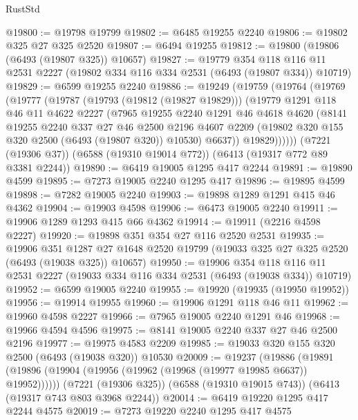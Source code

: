 \begin{lexlean}{RustStd}
\begin{coremodule}
@19800 := @19798 @19799
@19802 := @6485 @19255 @2240
@19806 := @19802 @325 @27 @325 @2520
@19807 := @6494 @19255
@19812 := @19800 (@19806 (@6493 (@19807 @325)) @10657)
@19827 := @19779
    @354
    @118
    @116
    @11
    @2531
    @2227
    (@19802 @334 @116 @334 @2531 (@6493 (@19807 @334)) @10719)
@19829 := @6599 @19255 @2240
@19886 := @19249
    (@19759
      (@19764
        (@19769
          (@19777
            (@19787
              (@19793 (@19812 (@19827 @19829)))
              (@19779
                @1291
                @118
                @46
                @11
                @4622
                @2227
                (@7965
                  @19255
                  @2240
                  @1291
                  @46
                  @4618
                  @4620
                  (@8141
                    @19255
                    @2240
                    @337
                    @27
                    @46
                    @2500
                    @2196
                    @4607
                    @2209
                    (@19802 @320 @155 @320 @2500 (@6493 (@19807 @320)) @10530)
                    @6637))
                @19829))))))
    (@7221 (@19306 @37))
    (@6588 (@19310 @19014 @772))
    (@6413 (@19317 @772 @89 @3381 @2244))
@19890 := @6419 @19005 @1295 @417 @2244
@19891 := @19890 @4599
@19895 := @7273 @19005 @2240 @1295 @417
@19896 := @19895 @4599
@19898 := @7282 @19005 @2240
@19903 := @19898 @1289 @1291 @415 @46 @4362
@19904 := @19903 @4598
@19906 := @6473 @19005 @2240
@19911 := @19906 @1289 @1293 @415 @66 @4362
@19914 := @19911 (@2216 @4598 @2227)
@19920 := @19898 @351 @354 @27 @116 @2520 @2531
@19935 := @19906
    @351
    @1287
    @27
    @1648
    @2520
    @19799
    (@19033 @325 @27 @325 @2520 (@6493 (@19038 @325)) @10657)
@19950 := @19906
    @354
    @118
    @116
    @11
    @2531
    @2227
    (@19033 @334 @116 @334 @2531 (@6493 (@19038 @334)) @10719)
@19952 := @6599 @19005 @2240
@19955 := @19920 (@19935 (@19950 @19952))
@19956 := @19914 @19955
@19960 := @19906 @1291 @118 @46 @11
@19962 := @19960 @4598 @2227
@19966 := @7965 @19005 @2240 @1291 @46
@19968 := @19966 @4594 @4596
@19975 := @8141 @19005 @2240 @337 @27 @46 @2500 @2196
@19977 := @19975 @4583 @2209
@19985 := @19033 @320 @155 @320 @2500 (@6493 (@19038 @320)) @10530
@20009 := @19237
    (@19886 (@19891 (@19896 (@19904 (@19956 (@19962 (@19968 (@19977 @19985 @6637)) @19952))))))
    (@7221 (@19306 @325))
    (@6588 (@19310 @19015 @743))
    (@6413 (@19317 @743 @803 @3968 @2244))
@20014 := @6419 @19220 @1295 @417 @2244 @4575
@20019 := @7273 @19220 @2240 @1295 @417 @4575

\end{coremodule}
\end{lexlean}
